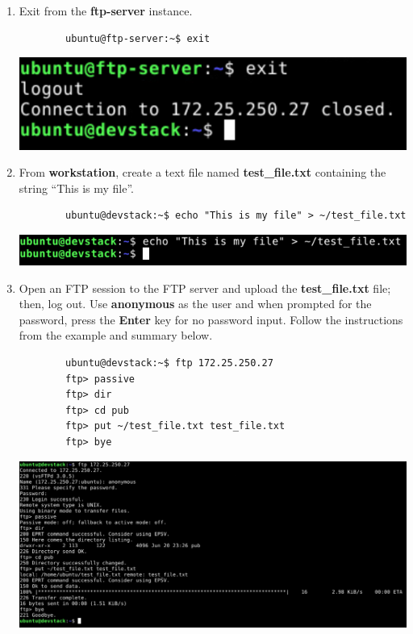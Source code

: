 \documentclass[letterpaper, 12pt]{article}
\begin{document}
\begin{enumerate}
    \item Exit from the \textbf{ftp-server} instance.
    \begin{lstlisting}
        ubuntu@ftp-server:~$ exit
    \end{lstlisting}

    \begin{center}
        \includegraphics[width=\linewidth]{images/part2/step17.png}
    \end{center}

    \item From \textbf{workstation}, create a text file named \textbf{test\_file.txt} containing the string ``This is my file''.
    \begin{lstlisting}
        ubuntu@devstack:~$ echo "This is my file" > ~/test_file.txt
    \end{lstlisting}

    \begin{center}
        \includegraphics[width=\linewidth]{images/part2/step18.png}
    \end{center}

    \item Open an FTP session to the FTP server and upload the \textbf{test\_file.txt} file; then, log out.
    Use \textbf{anonymous} as the user and when prompted for the password, press the \textbf{Enter} key for no password input.
    Follow the instructions from the example and summary below.
    \begin{lstlisting}
        ubuntu@devstack:~$ ftp 172.25.250.27
        ftp> passive
        ftp> dir
        ftp> cd pub
        ftp> put ~/test_file.txt test_file.txt
        ftp> bye
    \end{lstlisting}

    \begin{center}
        \includegraphics[width=\linewidth]{images/part2/step19.png}
    \end{center}


\end{enumerate}
\end{document}
